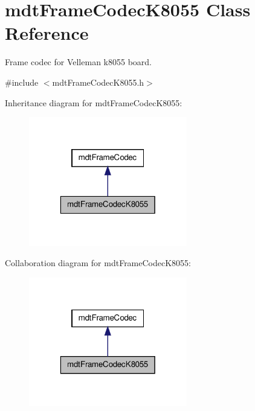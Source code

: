\hypertarget{classmdt_frame_codec_k8055}{
\section{mdtFrameCodecK8055 Class Reference}
\label{classmdt_frame_codec_k8055}
}


Frame codec for Velleman k8055 board.  




{\ttfamily \#include $<$mdtFrameCodecK8055.h$>$}



Inheritance diagram for mdtFrameCodecK8055:
\nopagebreak
\begin{figure}[H]
\begin{center}
\leavevmode
\includegraphics[width=196pt]{classmdt_frame_codec_k8055__inherit__graph}
\end{center}
\end{figure}


Collaboration diagram for mdtFrameCodecK8055:
\nopagebreak
\begin{figure}[H]
\begin{center}
\leavevmode
\includegraphics[width=196pt]{classmdt_frame_codec_k8055__coll__graph}
\end{center}
\end{figure}
